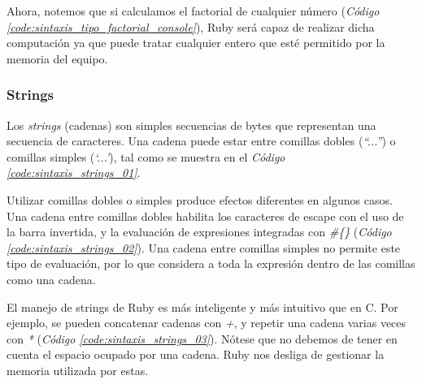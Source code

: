 \documentclass{article}
\newcommand{\refcode}[1]{\textit{Código \ref{#1}}}
\begin{document}
 
\bigskip

Ahora, notemos que si calculamos el factorial de cualquier número (\refcode{code:sintaxis_tipo_factorial_console}), Ruby será capaz de realizar dicha computación ya que puede tratar cualquier entero que esté permitido por la memoria del equipo.

 
\bigskip


\subsubsection{Strings}
	
	Los \textit{strings} (cadenas) son simples secuencias de bytes que representan una secuencia de caracteres. Una cadena puede estar entre comillas dobles (\textit{``...''}) o comillas simples (\textit{`...'}), tal como se muestra en el \refcode{code:sintaxis_strings_01}. 


\bigskip

	Utilizar comillas dobles o simples produce efectos diferentes en algunos casos. Una cadena entre comillas dobles habilita los caracteres de escape con el uso de la barra invertida, y la evaluación de expresiones integradas con \textit{\#\{\}} (\refcode{code:sintaxis_strings_02}). Una cadena entre comillas simples no permite este tipo de evaluación, por lo que considera a toda la expresión dentro de las comillas como una cadena.

 
\bigskip

	El manejo de strings de Ruby es más inteligente y más intuitivo que en C. Por ejemplo, se pueden concatenar cadenas con \textit{+}, y repetir una cadena varias veces con \textit{*} (\refcode{code:sintaxis_strings_03}). Nótese que no debemos de tener en cuenta el espacio ocupado por una cadena. Ruby nos desliga de gestionar la memoria utilizada por estas.

 
\bigskip
\end{document}
